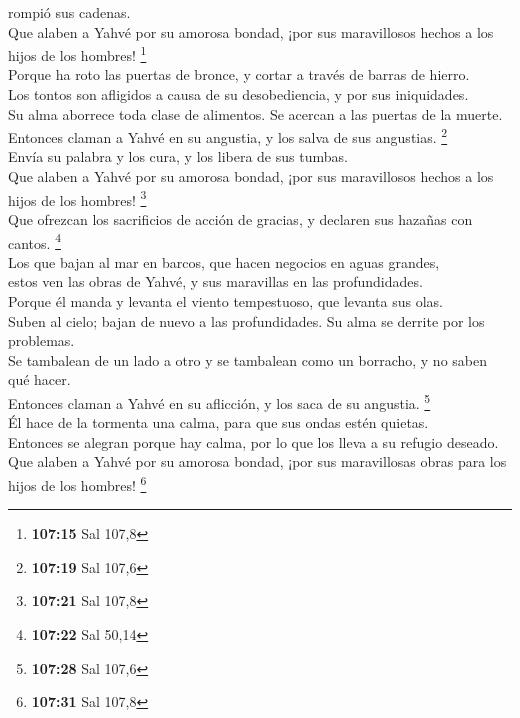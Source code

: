 rompió sus cadenas.\\
 Que alaben a Yahvé por su amorosa bondad, ¡por sus
maravillosos hechos a los hijos de los hombres! \footnote{\textbf{107:15}
  Sal 107,8}\\
 Porque ha roto las puertas de bronce, y cortar a través
de barras de hierro.\\
 Los tontos son afligidos a causa de su desobediencia, y
por sus iniquidades.\\
 Su alma aborrece toda clase de alimentos. Se acercan a
las puertas de la muerte.\\
 Entonces claman a Yahvé en su angustia, y los salva de
sus angustias. \footnote{\textbf{107:19} Sal 107,6}\\
 Envía su palabra y los cura, y los libera de sus
tumbas.\\
 Que alaben a Yahvé por su amorosa bondad, ¡por sus
maravillosos hechos a los hijos de los hombres! \footnote{\textbf{107:21}
  Sal 107,8}\\
 Que ofrezcan los sacrificios de acción de gracias, y
declaren sus hazañas con cantos. \footnote{\textbf{107:22} Sal 50,14}\\
 Los que bajan al mar en barcos, que hacen negocios en
aguas grandes,\\
 estos ven las obras de Yahvé, y sus maravillas en las
profundidades.\\
 Porque él manda y levanta el viento tempestuoso, que
levanta sus olas.\\
 Suben al cielo; bajan de nuevo a las profundidades. Su
alma se derrite por los problemas.\\
 Se tambalean de un lado a otro y se tambalean como un
borracho, y no saben qué hacer.\\
 Entonces claman a Yahvé en su aflicción, y los saca de
su angustia. \footnote{\textbf{107:28} Sal 107,6}\\
 Él hace de la tormenta una calma, para que sus ondas
estén quietas.\\
 Entonces se alegran porque hay calma, por lo que los
lleva a su refugio deseado.\\
 Que alaben a Yahvé por su amorosa bondad, ¡por sus
maravillosas obras para los hijos de los hombres! \footnote{\textbf{107:31}
  Sal 107,8}\\
